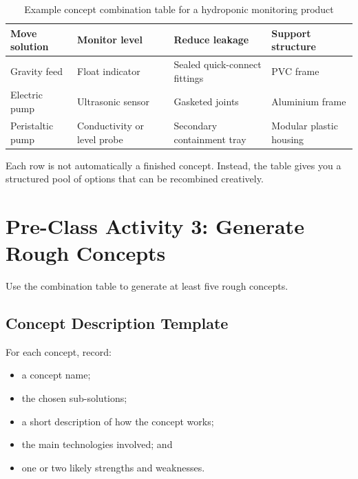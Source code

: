 \begin{table}[htbp]
\centering
\caption{Example concept combination table for a hydroponic monitoring product}
\label{tab:session10-combination-table}
\renewcommand{\arraystretch}{1.2}
\begin{tabularx}{\textwidth}{|>{\raggedright\arraybackslash}p{}|>{\raggedright\arraybackslash}p{}|>{\raggedright\arraybackslash}p{}|>{\raggedright\arraybackslash}X|}
\hline
\textbf{Move solution} & \textbf{Monitor level} & \textbf{Reduce leakage} & \textbf{Support structure} \\
\hline
Gravity feed & Float indicator & Sealed quick-connect fittings & PVC frame \\
\hline
Electric pump & Ultrasonic sensor & Gasketed joints & Aluminium frame \\
\hline
Peristaltic pump & Conductivity or level probe & Secondary containment tray & Modular plastic housing \\
\hline
\end{tabularx}
\end{table}

Each row is not automatically a finished concept. Instead, the table gives you a structured pool of options that can be recombined creatively.

\section{Pre-Class Activity 3: Generate Rough Concepts}

Use the combination table to generate at least five rough concepts.

\subsection{Concept Description Template}

For each concept, record:
\begin{itemize}
    \item a concept name;
    \item the chosen sub-solutions;
    \item a short description of how the concept works;
    \item the main technologies involved; and
    \item one or two likely strengths and weaknesses.
\end{itemize}

